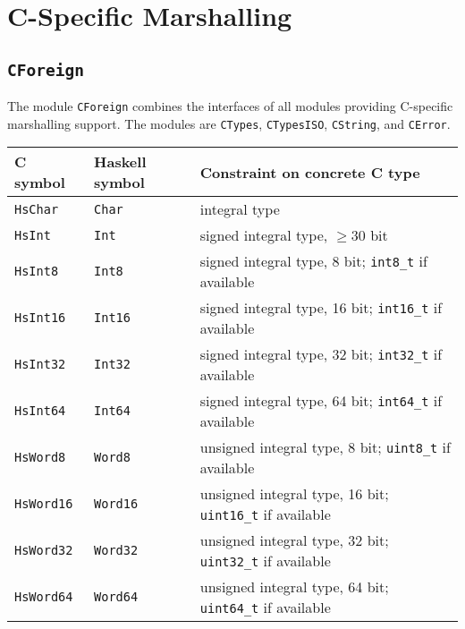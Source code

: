 \documentclass[a4paper,twosides]{article}
\newcommand{\code}[1]{\texttt{#1}}      %
\begin{document}
\newpage
\section{C-Specific Marshalling}
\label{sec:c-marshalling}

\subsection{\code{CForeign}}
\label{sec:CForeign}

The module \code{CForeign} combines the interfaces of all modules providing
C-specific marshalling support.  The modules are \code{CTypes},
\code{CTypesISO}, \code{CString}, and \code{CError}.

\begin{table}
  \begin{center}
    \begin{tabular}{|l|l|l|}
      \hline
      C symbol          & Haskell symbol & Constraint on concrete C type\\
      \hline\hline
      \code{HsChar}     & \code{Char}    
      & integral type\\
      \hline
      \code{HsInt}      & \code{Int}
      & signed integral type, $\geq30$ bit\\
      \hline
      \code{HsInt8}     & \code{Int8}
      & signed integral type, 8 bit; \code{int8\_t} if available\\
      \hline
      \code{HsInt16}    & \code{Int16}
      & signed integral type, 16 bit; \code{int16\_t} if available\\
      \hline
      \code{HsInt32}    & \code{Int32}
      & signed integral type, 32 bit; \code{int32\_t} if available\\
      \hline
      \code{HsInt64}    & \code{Int64}
      & signed integral type, 64 bit; \code{int64\_t} if available\\ 
      \hline
      \code{HsWord8}    & \code{Word8}
      & unsigned integral type, 8 bit; \code{uint8\_t} if available\\
      \hline
      \code{HsWord16}   & \code{Word16}
      & unsigned integral type, 16 bit; \code{uint16\_t} if available\\
      \hline
      \code{HsWord32}   & \code{Word32}
      & unsigned integral type, 32 bit; \code{uint32\_t} if available\\
      \hline
      \code{HsWord64}   & \code{Word64}
      & unsigned integral type, 64 bit; \code{uint64\_t} if available\\

\end{tabular}
\end{center}
\end{table}
\end{document}

